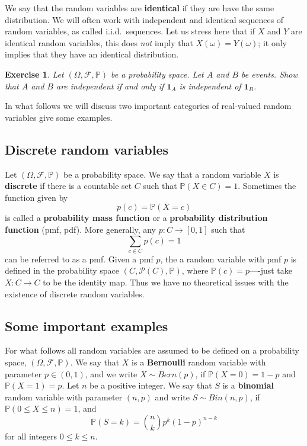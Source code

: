 \documentclass[12pt, reqno]{amsart}
\newtheorem{ex}{Exercise}[section]
\newcommand\dff[1]{\textbf{#1}}
\newcommand\powerset{ { \boldsymbol{\mathcal P}}}
\renewcommand{\P}{{\mathbb P}}  %
\newcommand{\F}{{\mathcal F}}     %
\begin{document}
We say that the random variables are \dff{identical} if they are have the same distribution.  We will often work with independent and identical sequences of random variables, as called i.i.d.\ sequences.  Let us stress here that if $X$ and $Y$ are identical random variables, this does {\em not} imply that $X(\omega) = Y(\omega)$; it only implies that they have an identical distribution.

\begin{ex} Let $(\Omega, \F, \P)$ be a probability space.  Let $A$ and $B$ be events.  Show that $A$ and $B$ are independent if and only if $\mathbf{1}_A$ is independent of $\mathbf{1}_B$.  
	
	\end{ex}


In what follows we will discuss two important categories of real-valued random variables give some examples.  

 

\subsection{Discrete random variables}

Let $(\Omega, \F, \P)$ be a probability space.  We say that a random variable $X$ is \dff{discrete} if there is a countable set $C$ such that $\P(X \in C) =1$.  Sometimes the function given by
$$ p(c) = \P(X=c)$$ 
is called a \dff{probability mass function} or a \dff{probability distribution function} (pmf, pdf).     More generally, any $p: C \to [0,1]$ such that $$\sum_{c \in C} p(c) =1$$ can be referred to as a pmf.  Given a pmf $p$, the a random variable with pmf $p$ is defined in  the  probability space $(C, \powerset(C), \P)$, where $\P(c) = p$----just take $X: C \to C$ to be the identity map.  Thus we have no theoretical issues with the existence of discrete random variables.     


\subsection{Some important examples} 
For what follows all random variables are assumed to be defined on a probability space, $(\Omega, \F, \P)$.  
%
We say that  $X$ is a \dff{Bernoulli} random variable with parameter $p \in (0,1)$, and we write $X \sim Bern(p)$,  if $\P(X=0) = 1-p$ and $\P(X=1) = p$.  Let $n$ be a positive integer.   We say  that $S$ is a \dff{binomial} random variable with parameter $(n,p)$ and write $S \sim Bin(n,p)$,  if $\P( 0 \leq X \leq n) = 1$, and 
$$\P(S=k) = {n \choose k}p^k(1-p)^{n-k}$$ 
for all integers $ 0\leq k \leq n$.  
\end{document}
